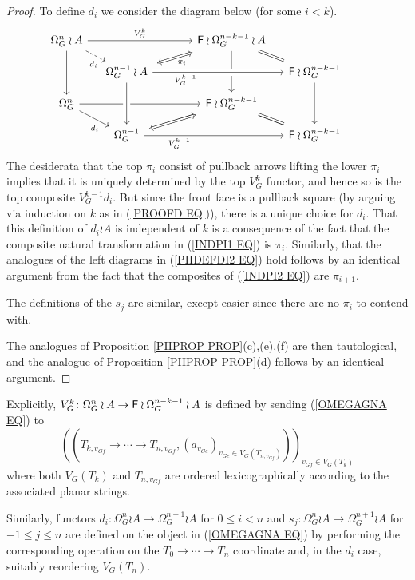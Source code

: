 \documentclass[a4paper,10pt]{article}%
\begin{document}
\begin{proof}
To define $d_i$ we consider the diagram below (for some $i<k$).
\[
\begin{tikzcd}[column sep = small, row sep = small]
	\Omega_{G}^n \wr A \ar{rrrr}{V_G^{k}} \ar[dashed]{rd}[swap,near end]{d_i} \ar{dd}
	&&
	&&
	|[alias=FFOmegan]|\Fin \wr \Omega_G^{n-k-1} \wr A  \ar[dd] \ar[equal]{rd}
\\
	&
	|[alias=Omeganp1]|\Omega_{G}^{n-1} \wr A \ar[crossing over]{rrrr}[swap,near start]{V_G^{k-1}} &&&&
	|[alias=Omeganp2]|
	\Fin \wr \Omega_G^{n-k-1} \ar{dd}&
\\
	\Omega_{G}^{n} \ar{rrrr} \ar{rd}[swap,near end]{d_i}&&
	 &&
	|[alias=FFOmeganm1]| \Fin \wr \Omega_G^{n-k-1} \ar[rd,equal] 
\\
	&
	|[alias=Omegan]|\Omega_G^{n-1} \ar{rrrr}[swap,near start]{V_G^{k-1}} &&&&
	\Fin \wr \Omega_G^{n-k-1} &
	\arrow[Leftrightarrow, from=Omeganp1, to=FFOmegan,shorten <=0.15cm,shorten >=0.15cm,swap,"\pi_i"]
	\arrow[Leftrightarrow, from=FFOmeganm1, to=Omegan,shorten <=0.15cm,shorten >=0.15cm]
	\arrow[from=Omeganp1, to=Omegan,crossing over]
\end{tikzcd}
\]
The desiderata that the top $\pi_i$ consist of pullback arrows lifting the lower $\pi_i$ implies that it is uniquely determined by the top $V_G^k$ functor, and hence so is the top composite 
$V_G^{k-1}d_i$. But since the front face is a pullback square
(by arguing via induction on $k$ as in (\ref{PROOFD EQ})), there is a unique choice for $d_i$. 
That this definition of $d_i \wr A$ is
independent of $k$ 
is a consequence of the fact that the composite natural transformation in (\ref{INDPI1 EQ}) is $\pi_i$.
Similarly, that the analogues of the left diagrams in 
(\ref{PIIDEFDI2 EQ})
hold follows by an identical argument from the fact that the composites of (\ref{INDPI2 EQ}) are $\pi_{i+1}$.

The definitions of the $s_j$ are similar, except easier since there are no $\pi_i$ to contend with.

The analogues of Proposition \ref{PIIPROP PROP}(c),(e),(f) are then tautological, and the analogue of 
Proposition \ref{PIIPROP PROP}(d)
follows by an identical argument.
\end{proof}

\begin{remark}\label{VGDEFA REM}
Explicitly,
$V_G^{k} \colon \Omega_{G}^{n} \wr A
\to \mathsf{F} \wr \Omega_{G}^{n-k-1} \wr A $
is defined by sending (\ref{OMEGAGNA EQ}) to
\[
	\left(
		\left(
		T_{k,v_{G f}} \to \cdots \to T_{n,v_{G f}},
		\left(
		a_{v_{G e}}
		\right)_{v_{G e} \in V_G\left(T_{n,v_{G f}}\right)}
		\right)
	\right)_{v_{G f} \in V_G(T_k)}
\]
where both $V_G(T_k)$ and $T_{n,v_{G f}}$ are ordered lexicographically according to the associated planar strings.

Similarly, functors 
$d_i \colon \Omega_{G}^{n} \wr A \to \Omega_{G}^{n-1} \wr A$
for $0 \leq i < n$
and 
$s_j \colon \Omega_{G}^{n} \wr A \to \Omega_{G}^{n+1} \wr A$
for $-1 \leq j \leq n$
are defined on the object in (\ref{OMEGAGNA EQ})
by performing the corresponding operation on the $T_0 \to \cdots \to T_n$ coordinate and, in the $d_i$ case,
 suitably reordering $V_G(T_n)$.
\end{remark}
\end{document}
